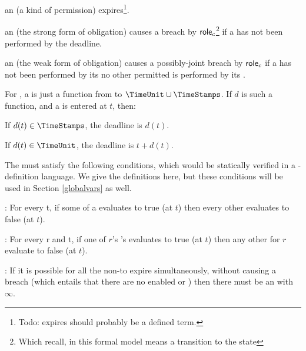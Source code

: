 \documentclass[12pt]{article}
\begin{document}
\begin{LPPI}
	\item an \enabled \mayntran (a kind of permission) expires\footnote{Todo: expires should probably be a defined term.}.
	\item an \enabled \mustntran (the strong form of obligation) causes a breach by $\textsf{role}_{c}$\footnote{Which recall, in this formal model means a transition to the state \breached{\{\role{\evar}\}}} if a \compatible \Event has not been performed by the deadline.
	\item an \enabled \rmustntran (the weak form of obligation) causes a possibly-joint breach by $\textsf{role}_{c}$ if a \compatible \Event has not been performed by its \Deadline\xspace {\bf and} no other permitted \Event is performed by its \Deadline.
	\end{LPPI}
For \FSContracts, a \DeadlineFn is just a function from \TimeStamps to $\TimeUnit \cup \TimeStamps$. If $d$ is such a function, and a \State is entered at \TimeStamp $t$, then:
\begin{LPPI}
\item If $d(t) \in \TimeStamps$, the deadline is $d(t)$.
	\item If $d(t) \in \TimeUnit$, the deadline is $t + d(t)$.
\end{LPPI}

The \TGuards must satisfy the following conditions, which would be statically verified in a \Contract-definition language. We give the \FSContracts definitions here, but these conditions will be used in Section \ref{globalvars} as well.
\medskip

\noindent {}: For every \TimeStamp t, if some \TGuard of a \mustntran evaluates to true (at $t$) then every other \TGuard evaluates to false (at $t$).
\medskip

\noindent {}: For every \Role r and \TimeStamp t, if one of $r$'s \rmustntrans's \TGuards evaluates to true (at $t$) then any other \rmustntrans for $r$ evaluate to false (at $t$).
\medskip

\noindent {}: If it is possible for all the \enabled non-\Env \connections to expire simultaneously, without causing a breach (which entails that there are no enabled \mustntrans or \rmustntrans) then there must be an \depTrans{\Env} with \Deadline $\infty$.
\smallskip
\end{document}
